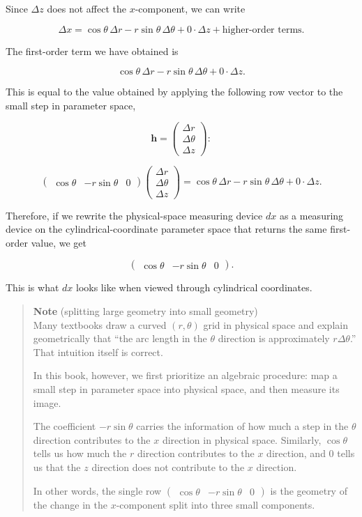 \documentclass[a4paper,12pt,openany]{book}
\begin{document}
Since \(\Delta z\) does not affect the \(x\)-component, we can write

\[
\Delta x
=
\cos\theta\,\Delta r
-r\sin\theta\,\Delta\theta
+0\cdot\Delta z
+
\text{higher-order terms}.
\]

The first-order term we have obtained is

\[
\cos\theta\,\Delta r
-r\sin\theta\,\Delta\theta
+0\cdot\Delta z.
\]

This is equal to the value obtained by applying the following row vector
to the small step in parameter space,

\[
\mathbf h
=
\begin{pmatrix}
\Delta r\\
\Delta\theta\\
\Delta z
\end{pmatrix}:
\]

\[
\begin{pmatrix}
\cos\theta & -r\sin\theta & 0
\end{pmatrix}
\begin{pmatrix}
\Delta r\\
\Delta\theta\\
\Delta z
\end{pmatrix}
=
\cos\theta\,\Delta r
-r\sin\theta\,\Delta\theta
+0\cdot\Delta z.
\]

Therefore, if we rewrite the physical-space measuring device \(dx\) as a
measuring device on the cylindrical-coordinate parameter space that
returns the same first-order value, we get

\[
\begin{pmatrix}
\cos\theta & -r\sin\theta & 0
\end{pmatrix}.
\]

This is what \(dx\) looks like when viewed through cylindrical
coordinates.

\begin{quote}
\textbf{Note} (splitting large geometry into small geometry)\\
Many textbooks draw a curved \((r,\theta)\) grid in physical space and
explain geometrically that ``the arc length in the \(\theta\) direction
is approximately \(r\Delta\theta\).'' That intuition itself is correct.

In this book, however, we first prioritize an algebraic procedure: map a
small step in parameter space into physical space, and then measure its
image.

The coefficient \(-r\sin\theta\) carries the information of how much a
step in the \(\theta\) direction contributes to the \(x\) direction in
physical space. Similarly, \(\cos\theta\) tells us how much the \(r\)
direction contributes to the \(x\) direction, and \(0\) tells us that
the \(z\) direction does not contribute to the \(x\) direction.

In other words, the single row
\(\begin{pmatrix}\cos\theta & -r\sin\theta & 0\end{pmatrix}\) is the
geometry of the change in the \(x\)-component split into three small
components.
\end{quote}
\end{document}
